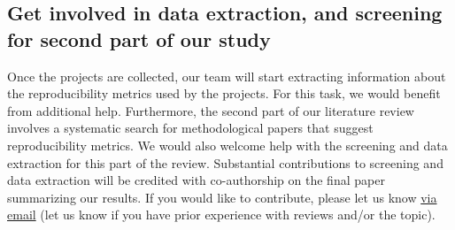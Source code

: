 \documentclass[a4paper,11pt]{report}
\begin{document}
\subsection*{Get involved in data extraction, and screening for second part of our study}
Once the projects are collected, our team will start extracting information about the reproducibility metrics used by the projects. For this task, we would benefit from additional help. Furthermore, the second part of our literature review involves a systematic search for methodological papers that suggest reproducibility metrics. We would also welcome help with the screening and data extraction for this part of the review. Substantial contributions to screening and data extraction will be credited with co-authorship on the final paper summarizing our results. If you would like to contribute, please let us know \href{mailto:rachel.heyard@uzh.ch}{via email} (let us know if you have prior experience with reviews and/or the topic).
\end{document}
